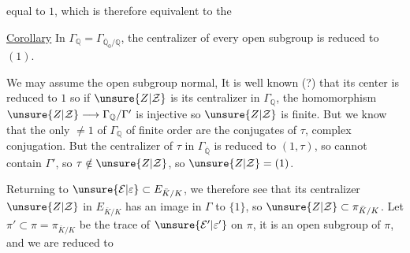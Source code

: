 equal to $1$, which is therefore equivalent to the

\uline{Corollary} In $\Gamma_{\mathbb Q}=\Gamma_{\overline{\mathbb Q}_0/\mathbb Q}$, the centralizer of every open subgroup is reduced to $(1)$.

We may assume the open subgroup  normal, It is well known (?) that its center is reduced to $1$
so if $\unsure{Z|\mathcal Z}$ is its centralizer in $\Gamma_{\mathbb Q}$, the homomorphism $\unsure{Z|\mathcal Z}\longrightarrow\Gamma_{\mathbb Q}/\Gamma'$ is injective so $\unsure{Z|\mathcal Z}$ is finite. But we know that the only  $\neq1$ of $\Gamma_{\mathbb Q}$ of finite order are the conjugates of $\tau$, complex conjugation. But the centralizer of $\tau$ in $\Gamma_{\overline{\mathbb Q}}$ is reduced to $(1,\tau)$, so cannot contain $\Gamma'$, so $\tau\notin\unsure{Z|\mathcal Z}$, so $\unsure{Z|\mathcal Z}=(1)$.

Returning to $\unsure{\mathcal E|\varepsilon}\subset E_{\bar K/K}$, we therefore see that its centralizer $\unsure{Z|\mathcal Z}$ in $E_{\bar K/K}$ has an image in $\Gamma$  to $\{1\}$, so $\unsure{Z|\mathcal Z}\subset\pi_{\bar K/K}$. Let $\pi'\subset\pi=\pi_{\bar K/K}$ be the trace of $\unsure{\mathcal E'|\varepsilon'}$ on $\pi$, it is an open subgroup of $\pi$, and we are reduced to

